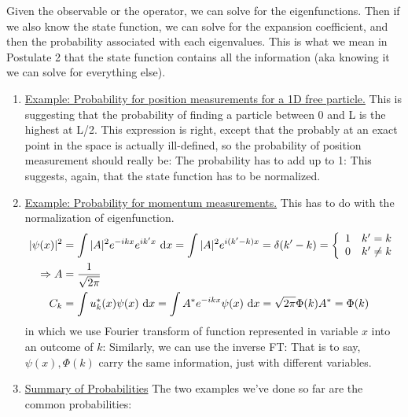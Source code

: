 \documentclass{school-22.101-notes}
\begin{document}
Given the observable or the operator, we can solve for the eigenfunctions. Then if we also know the state function, we can solve for the expansion coefficient, and then the probability associated with each eigenvalues. This is what we mean in Postulate 2 that the state function contains all the information (aka knowing it we can solve for everything else). 

\begin{enumerate}
\item \uline{Example: Probability for position measurements for a 1D free particle.} 
This is suggesting that the probability of finding a particle between 0 and L is the highest at L/2. This expression is right, except that the probably at an exact point in the space is actually ill-defined, so the probability of position measurement should really be:
The probability has to add up to 1: 
This suggests, again, that the state function has to be normalized. 

\item \uline{Example: Probability for momentum measurements.} This has to do with the normalization of eigenfunction. 
\begin{align}
|\psi (x)|^2 &= \int |A|^2 e^{-ikx} e^{ik^{\prime}x} \mbox{ }\mathrm{d} x = \int |A|^2 e^{i(k^{\prime}-k)x} = \delta(k^{\prime} - k) = \left\{ \begin{array}{cc}  1 & k^{\prime} = k  \\ 0 &  k^{\prime} \neq k   \end{array} \right. \\
\Rightarrow A &= \frac{1}{\sqrt{2 \pi}}  \\
 C_k &= \int  u_k^*(x) \psi(x) \mbox{ }\mathrm{d} x = \int  A^* e^{-ikx} \psi(x) \mbox{ }\mathrm{d} x = \sqrt{2 \pi} \Phi(k) A^* = \Phi(k)
\end{align}
in which we use Fourier transform of function represented in variable $x$ into an outcome of $k$:
Similarly, we can use the inverse FT:
That is to say, $\psi(x), \Phi(k)$ carry the same information, just with different variables. 


\item \uline{Summary of Probabilities}
The two examples we've done so far are the common probabilities:


\end{enumerate}
\end{document}

